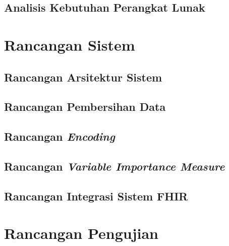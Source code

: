 \documentclass[ugmtesis]{ugmtesis}
\begin{document}
		\subsection{Analisis Kebutuhan Perangkat Lunak}
		\label{rancangan analisis kebutuhan perangkat lunak}
		

	\section{Rancangan Sistem}
	\label{rancangan sistem}
	

		\subsection{Rancangan Arsitektur Sistem}
		\label{rancangan Arsitektur Sistem}
		

		\subsection{Rancangan Pembersihan Data}
		\label{rancangan pembersihan data}
		

		\subsection{Rancangan \textit{Encoding}}
		\label{rancangan encoding}
		

		\subsection{Rancangan \textit{Variable Importance Measure}}
		\label{rancangan variable importance measure}
		

		\subsection{Rancangan Integrasi Sistem FHIR}
		\label{rancangan integrasi sistem fhir}
		

	\section{Rancangan Pengujian}
	\label{rancangan pengujian}
	
\end{document}
